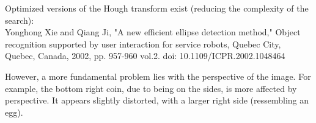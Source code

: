 \documentclass[11pt]{article}
\begin{document}
Optimized versions of the Hough transform exist (reducing the complexity
of the search):\\
Yonghong Xie and Qiang Ji, "A new efficient ellipse detection method,"
Object recognition supported by user interaction for service robots,
Quebec City, Quebec, Canada, 2002, pp. 957-960 vol.2. doi:
10.1109/ICPR.2002.1048464

However, a more fundamental problem lies with the perspective of the
image. For example, the bottom right coin, due to being on the sides, is
more affected by perspective. It appears slightly distorted, with a
larger right side (ressembling an egg).


    
    
    
    
\end{document}
